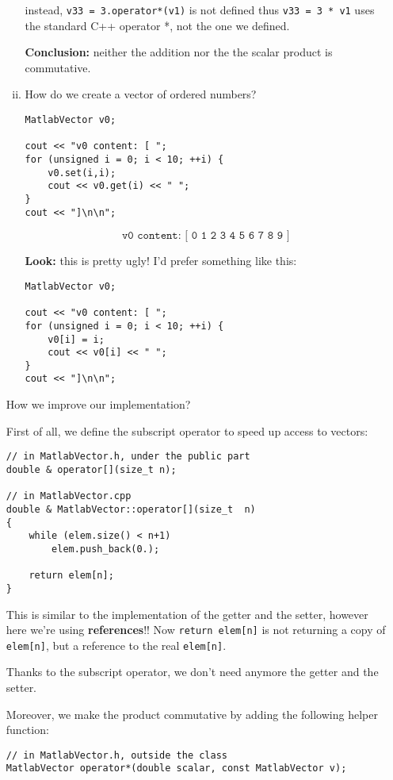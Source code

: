 \begin{enumerate}[$\triangleright$]
\begin{enumerate}[(i)]
instead, \lstinline|v33 = 3.operator*(v1)| is not defined thus \lstinline|v33 = 3 * v1| uses the standard C++ operator *, not the one we defined.  

\textbf{Conclusion: }neither the addition nor the
 the scalar product is commutative.

\item How do we create a vector of ordered numbers?
\begin{lstlisting}
MatlabVector v0;

cout << "v0 content: [ ";
for (unsigned i = 0; i < 10; ++i) {
    v0.set(i,i);
    cout << v0.get(i) << " ";
}
cout << "]\n\n";
\end{lstlisting}
\begin{equation*}
\texttt{v0 content: [ 0 1 2 3 4 5 6 7 8 9 ]}
\end{equation*}

\textbf{Look:} this is pretty ugly! I'd prefer something like this:
\begin{lstlisting}
MatlabVector v0;

cout << "v0 content: [ ";
for (unsigned i = 0; i < 10; ++i) {
    v0[i] = i;
    cout << v0[i] << " ";
}
cout << "]\n\n";
\end{lstlisting}
\end{enumerate}

How we improve our implementation?

First of all, we define the subscript operator to speed up access to vectors:
\begin{lstlisting}
// in MatlabVector.h, under the public part
double & operator[](size_t n);

// in MatlabVector.cpp
double & MatlabVector::operator[](size_t  n) 
{
    while (elem.size() < n+1)
        elem.push_back(0.);
    
    return elem[n];
}
\end{lstlisting}

This is similar to the implementation of the getter and the setter, however here we're using \textbf{references}!! Now \lstinline|return elem[n]| is not returning a copy of \lstinline|elem[n]|, but a reference to the real \lstinline|elem[n]|.

\begin{marker}
Thanks to the subscript operator, we don't need anymore the getter and the setter.   
\end{marker}

Moreover, we make the product commutative by adding the following helper function:
\begin{lstlisting}
// in MatlabVector.h, outside the class
MatlabVector operator*(double scalar, const MatlabVector v);


\end{lstlisting}
\end{enumerate}
